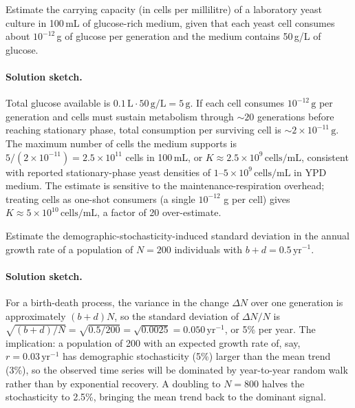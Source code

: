 \begin{exercise}
Estimate the carrying capacity (in cells per millilitre) of a
laboratory yeast culture in 100\,mL of glucose-rich medium, given
that each yeast cell consumes about $10^{-12}$\,g of glucose per
generation and the medium contains 50\,g/L of glucose.
\paragraph{Solution sketch.} Total glucose available is
$0.1\,\text{L} \cdot 50\,\text{g/L} = 5\,\text{g}$. If each cell
consumes $10^{-12}\,\text{g}$ per generation and cells must sustain
metabolism through $\sim 20$ generations before reaching stationary
phase, total consumption per surviving cell is $\sim 2 \times
10^{-11}\,\text{g}$. The maximum number of cells the medium
supports is $5 / (2 \times 10^{-11}) = 2.5 \times 10^{11}$ cells
in 100\,mL, or $K \approx 2.5 \times 10^9\,\text{cells/mL}$,
consistent with reported stationary-phase yeast densities of
$1\text{--}5 \times 10^9\,\text{cells/mL}$ in YPD medium. The
estimate is sensitive to the maintenance-respiration overhead;
treating cells as one-shot consumers (a single $10^{-12}$ g per
cell) gives $K \approx 5 \times 10^{10}\,\text{cells/mL}$, a factor
of 20 over-estimate.
\end{exercise}

\begin{exercise}
Estimate the demographic-stochasticity-induced standard deviation
in the annual growth rate of a population of $N = 200$ individuals
with $b + d = 0.5\,\text{yr}^{-1}$.

\paragraph{Solution sketch.} For a birth-death process, the
variance in the change $\Delta N$ over one generation is
approximately $(b + d) N$, so the standard deviation of $\Delta
N/N$ is $\sqrt{(b + d)/N} = \sqrt{0.5/200} = \sqrt{0.0025} =
0.050\,\text{yr}^{-1}$, or 5\% per year. The implication: a
population of 200 with an expected growth rate of, say, $r = 0.03\,
\text{yr}^{-1}$ has demographic stochasticity (5\%) larger than
the mean trend (3\%), so the observed time series will be
dominated by year-to-year random walk rather than by exponential
recovery. A doubling to $N = 800$ halves the stochasticity to
2.5\%, bringing the mean trend back to the dominant signal.
\end{exercise}

